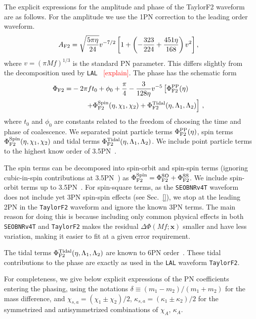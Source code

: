 \documentclass[prd,aps,letter,twocolumn,floatfix,notitlepage,nofootinbib]{revtex4-1}
\def\bx{\mathbf{x}}
\newcommand{\red}[1]{\textcolor{red}{#1}}
\begin{document}
The explicit expressions for the amplitude and phase of the TaylorF2 waveform are as follows. For the amplitude we use the 1PN correction to the leading order waveform.
\begin{equation}
A_{\rm F2} = \sqrt{\frac{5\pi\eta}{24}} v^{-7/2} \left[ 1 + \left(-\frac{323}{224} + \frac{451\eta}{168} \right)v^{2} \right],
\end{equation}
where $v=(\pi M f)^{1/3}$ is the standard PN parameter. This differs slightly from the decomposition used by \texttt{LAL}~\cite{lal} \red{[explain]}. The phase has the schematic form
\begin{align}
\Phi_{\rm F2} =& -2\pi f t_{0} + \phi_{0} + \frac{\pi}{4} - \frac{3}{128\eta}v^{-5} \left[\Phi_{\rm F2}^{\rm PP}(\eta) \right. \nonumber\\
	& \left. \qquad + \Phi_{\rm F2}^{\rm Spin} (\eta, \chi_1, \chi_2) + \Phi_{\rm F2}^{\rm Tidal}(\eta, \Lambda_1, \Lambda_2)  \right] \,,
\end{align}
where $t_{0}$ and $\phi_{0}$ are constants related to the freedom of choosing the time and phase of coalescence. We separated point particle terms $\Phi_{\rm F2}^{\rm PP}(\eta)$, spin terms $\Phi_{\rm F2}^{\rm Spin}(\eta, \chi_{1}, \chi_{2})$ and tidal terms $\Phi_{\rm F2}^{\rm Tidal}(\eta, \Lambda_1, \Lambda_2)$. We include point particle terms to the highest know order of 3.5PN~\cite{}.

The spin terms can be decomposed into spin-orbit and spin-spin terms (ignoring cubic-in-spin contributions at 3.5PN~\cite{}) as $\Phi_{\rm F2}^{\rm Spin} = \Phi_{\rm F2}^{\rm SO}  + \Phi_{\rm F2}^{\rm SS} $. We include spin-orbit terms up to 3.5PN~\cite{}. For spin-square terms, as the \texttt{SEOBNRv4T} waveform does not include yet 3PN spin-spin effects (see Sec.~\ref{}), we stop at  the leading 2PN in the \texttt{TaylorF2} waveform and ignore the known 3PN terms. The main reason for doing this is because including only common physical effects in both \texttt{SEOBNRv4T} and \texttt{TaylorF2} makes the residual $\Delta\Phi(Mf; \bx)$ smaller and have less variation, making it easier to fit at a given error requirement.

The tidal terms $\Phi_{\rm F2}^{\rm Tidal}(\eta, \Lambda_1, \Lambda_2)$ are known to 6PN order~\cite{VinesFlanaganHinderer2011}. These tidal contributions to the phase are exactly as used in the \texttt{LAL} waveform \texttt{TaylorF2}.

For completeness, we give below explicit expressions of the PN coefficients entering the phasing, using the notations $\delta \equiv (m_{1} - m_{2})/(m_{1} + m_{2})$ for the mass difference, and $\chi_{s,a} = (\chi_{1} \pm \chi_{2})/2$, $\kappa_{s,a} = (\kappa_{1} \pm \kappa_{2})/2$ for the symmetrized and antisymmetrized combinations of $\chi_{A}$, $\kappa_{A}$.
\end{document}
